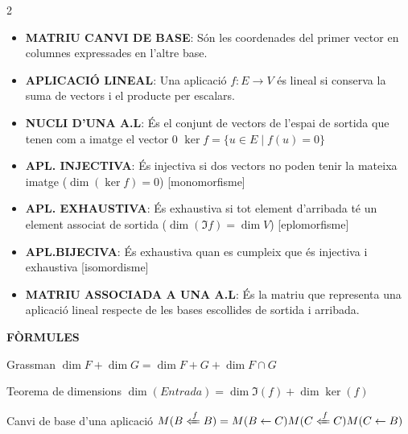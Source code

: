 \documentclass[9pt]{article}
\begin{document}
\begin{tcolorbox}[
    colback=white,
    colframe=black,
    boxrule=0.8pt,
    arc=0pt
]
\begin{multicols}{2}
\begin{itemize}
    \item \textbf{MATRIU CANVI DE BASE}: Són les coordenades del primer vector en columnes expressades en l'altre base.
    \item \textbf{APLICACIÓ LINEAL}: Una aplicació $f: E \rightarrow V$ és lineal si conserva la suma de vectors i el producte per escalars.
    \item \textbf{NUCLI D'UNA A.L}: És el conjunt de vectors de l'espai de sortida que tenen com a imatge el vector 0 $\ker f = \{u \in E \mid f(u) = 0\}$
    \item \textbf{APL. INJECTIVA}: És injectiva si dos vectors no poden tenir la mateixa imatge ($\dim(\ker f) = 0$) [monomorfisme]
    \item \textbf{APL. EXHAUSTIVA}: És exhaustiva si tot element d'arribada té un element associat de sortida ($\dim (\Im f) = \dim V$) [eplomorfisme]
    \item \textbf{APL.BIJECIVA}: És exhaustiva quan es cumpleix que és injectiva i exhaustiva [isomordisme]
    \item \textbf{MATRIU ASSOCIADA A UNA A.L}: És la matriu que representa una aplicació lineal respecte de les bases escollides de sortida i arribada.
\end{itemize}

\end{multicols}

\end{tcolorbox}

\noindent \textbf{FÒRMULES}

Grassman $\dim F + \dim G = \dim F+G + \dim F \cap G$

Teorema de dimensions $\dim (Entrada) = \dim \Im(f) + \dim \ker (f)$

Canvi de base d'una aplicació $M(B \xLeftarrow{f} B) = M(B \leftarrow C) M(C \xLeftarrow{f} C)M(C \leftarrow B)$
\end{document}
